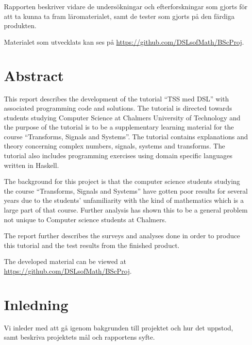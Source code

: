 \documentclass[12pt,a4paper,twoside,openright]{article}
\begin{document}
Rapporten beskriver vidare de undersökningar och efterforskningar som gjorts
för att ta kunna ta fram läromaterialet, samt de tester som gjorts på den
färdiga produkten.

Materialet som utvecklats kan ses på \url{https://github.com/DSLsofMath/BScProj}.

\newpage

\thispagestyle{plain}

\section*{Abstract}
This report describes the development of the tutorial ``TSS med DSL'' with
associated programming code and solutions. The tutorial is directed towards students
studying Computer Science at Chalmers University of Technology and the purpose of
the tutorial is to be a supplementary learning material for the course
``Transforms, Signals and Systems''. The tutorial contains explanations and
theory concerning complex numbers, signals, systems and transforms. The
tutorial also includes programming exercises using domain specific languages
written in Haskell.

The background for this project is that the computer science students studying
the course ``Transforms, Signals and Systems'' have gotten poor results for
several years due to the students' unfamiliarity with the kind of mathematics
which is a large part of that course. Further analysis has shown this to be a 
general problem not unique to Computer science students at Chalmers.

The report further describes the surveys and analyses done in order to produce
this tutorial and the test results from the finished product.

The developed material can be viewed at \url{https://github.com/DSLsofMath/BScProj}.

\newpage

\tableofcontents

\newpage

\printglossary[title=Ordlista,nonumberlist]

\newpage

\setcounter{page}{1}
\setlength{\parskip}{2mm plus2mm}

\section{Inledning}
Vi inleder med att gå igenom bakgrunden till projektet och hur det
uppstod, samt beskriva projektets mål och rapportens syfte.
\end{document}
